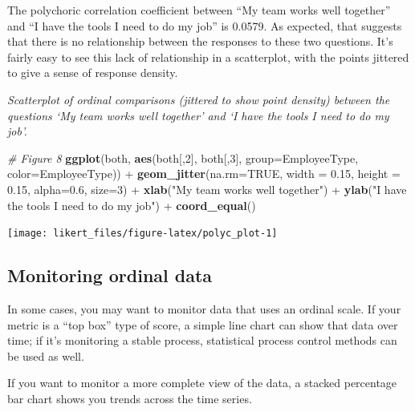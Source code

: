 \documentclass[]{book}
\newenvironment{Shaded}{\begin{snugshade}}{\end{snugshade}}
\newcommand{\KeywordTok}[1]{\textcolor[rgb]{0.13,0.29,0.53}{\textbf{{#1}}}}
\newcommand{\DataTypeTok}[1]{\textcolor[rgb]{0.13,0.29,0.53}{{#1}}}
\newcommand{\DecValTok}[1]{\textcolor[rgb]{0.00,0.00,0.81}{{#1}}}
\newcommand{\FloatTok}[1]{\textcolor[rgb]{0.00,0.00,0.81}{{#1}}}
\newcommand{\StringTok}[1]{\textcolor[rgb]{0.31,0.60,0.02}{{#1}}}
\newcommand{\CommentTok}[1]{\textcolor[rgb]{0.56,0.35,0.01}{\textit{{#1}}}}
\newcommand{\OtherTok}[1]{\textcolor[rgb]{0.56,0.35,0.01}{{#1}}}
\newcommand{\NormalTok}[1]{{#1}}
\begin{document}
The polychoric correlation coefficient between ``My team works well
together'' and ``I have the tools I need to do my job'' is 0.0579. As
expected, that suggests that there is no relationship between the
responses to these two questions. It's fairly easy to see this lack of
relationship in a scatterplot, with the points jittered to give a sense
of response density.

\emph{Scatterplot of ordinal comparisons (jittered to show point
density) between the questions `My team works well together' and `I have
the tools I need to do my job'.}

\begin{Shaded}
\begin{Highlighting}[]
\CommentTok{# Figure 8}
\KeywordTok{ggplot}\NormalTok{(both, }\KeywordTok{aes}\NormalTok{(both[,}\DecValTok{2}\NormalTok{], both[,}\DecValTok{3}\NormalTok{], }\DataTypeTok{group=}\NormalTok{EmployeeType, }\DataTypeTok{color=}\NormalTok{EmployeeType)) +}
\StringTok{  }\KeywordTok{geom_jitter}\NormalTok{(}\DataTypeTok{na.rm=}\OtherTok{TRUE}\NormalTok{, }\DataTypeTok{width =} \FloatTok{0.15}\NormalTok{, }\DataTypeTok{height =} \FloatTok{0.15}\NormalTok{, }\DataTypeTok{alpha=}\FloatTok{0.6}\NormalTok{, }\DataTypeTok{size=}\DecValTok{3}\NormalTok{) +}
\StringTok{  }\KeywordTok{xlab}\NormalTok{(}\StringTok{"My team works well together"}\NormalTok{) +}\StringTok{ }
\StringTok{  }\KeywordTok{ylab}\NormalTok{(}\StringTok{"I have the tools I need to do my job"}\NormalTok{) +}
\StringTok{  }\KeywordTok{coord_equal}\NormalTok{()}
\end{Highlighting}
\end{Shaded}

\begin{center}\texttt{[image: likert\_files/figure-latex/polyc\_plot-1]} \end{center}

\subsection{Monitoring ordinal data}\label{monitoring-ordinal-data}

In some cases, you may want to monitor data that uses an ordinal scale.
If your metric is a ``top box'' type of score, a simple line chart can
show that data over time; if it's monitoring a stable process,
statistical process control methods can be used as well.

If you want to monitor a more complete view of the data, a stacked
percentage bar chart shows you trends across the time series.
\end{document}
